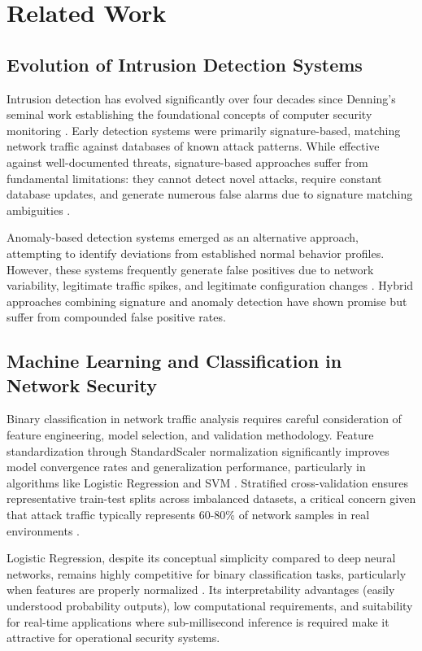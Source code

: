 \documentclass[conference]{IEEEtran}
\begin{document}
\section{Related Work}

\subsection{Evolution of Intrusion Detection Systems}

Intrusion detection has evolved significantly over four decades since Denning's seminal work establishing the foundational concepts of computer security monitoring \cite{ref5}. Early detection systems were primarily signature-based, matching network traffic against databases of known attack patterns. While effective against well-documented threats, signature-based approaches suffer from fundamental limitations: they cannot detect novel attacks, require constant database updates, and generate numerous false alarms due to signature matching ambiguities \cite{ref6}.

Anomaly-based detection systems emerged as an alternative approach, attempting to identify deviations from established normal behavior profiles. However, these systems frequently generate false positives due to network variability, legitimate traffic spikes, and legitimate configuration changes \cite{ref7}. Hybrid approaches combining signature and anomaly detection have shown promise but suffer from compounded false positive rates.

\subsection{Machine Learning and Classification in Network Security}

Binary classification in network traffic analysis requires careful consideration of feature engineering, model selection, and validation methodology. Feature standardization through StandardScaler normalization significantly improves model convergence rates and generalization performance, particularly in algorithms like Logistic Regression and SVM \cite{ref11}. Stratified cross-validation ensures representative train-test splits across imbalanced datasets, a critical concern given that attack traffic typically represents 60-80\% of network samples in real environments \cite{ref12}.

Logistic Regression, despite its conceptual simplicity compared to deep neural networks, remains highly competitive for binary classification tasks, particularly when features are properly normalized \cite{ref13}. Its interpretability advantages (easily understood probability outputs), low computational requirements, and suitability for real-time applications where sub-millisecond inference is required \cite{ref14} make it attractive for operational security systems.
\end{document}
